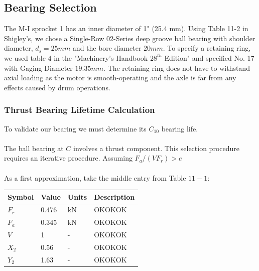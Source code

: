 \documentclass[letterpaper,12pt]{article}
\begin{document}
\subsection{Bearing Selection}
The M-I sprocket 1 has an inner diameter of 1" (25.4 mm). Using Table 11-2 in Shigley's, we chose a Single-Row 02-Series deep groove ball bearing with shoulder diameter, $d_s = 25mm$ and the bore diameter $20 mm$. To specify a retaining ring, we used table 4 in the "Machinery's Handbook $28^{th}$ Edition" and specified No. 17 with Gaging Diameter $19.35mm$. The retaining ring does not have to withstand axial loading as the motor is smooth-operating and the axle is far from any effects caused by drum operations. 


\subsubsection{Thrust Bearing Lifetime Calculation}
To validate our bearing we must determine its $C_{10}$ bearing life.\\ \\
The ball bearing at $C$ involves a thrust component. This selection procedure requires an iterative procedure. Assuming $F _ { a } / \left( V F _ { r } \right) > e$ \\ \\
As a first approximation, take the middle entry from Table $11 - 1 :$ \\

\begin{tabular}{ |p{1.5cm}||p{1.2cm}|p{2cm}|p{7cm}|  }
		\hline
		Symbol & Value & Units & Description\\
		\hline
		$F _ { r }$ & 0.476 & kN & OKOKOK\\
        $F _ { a }$ & 0.345 & kN  & OKOKOK\\			
	    $V$ & 1 & -  & OKOKOK\\
	    $X _ { 2 }$ & 0.56 & -  & OKOKOK\\
	    $Y _ { 2 }$ &1.63 & -  & OKOKOK\\
	    
	    \hline
\end{tabular}

%	
\end{document}
